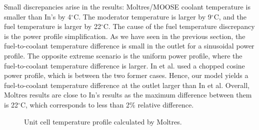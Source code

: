 Small discrepancies arise in the results: Moltres/MOOSE coolant temperature is smaller than In's by 4$^{\circ}$C.
The moderator temperature is larger by 9$^{\circ}$C, and the fuel temperature is larger by 22$^{\circ}$C.
The cause of the fuel temperature discrepancy is the power profile simplification.
As we have seen in the previous section, the fuel-to-coolant temperature difference is small in the outlet for a sinusoidal power profile. 
The opposite extreme scenario is the uniform power profile, where the fuel-to-coolant temperature difference is larger.
In et al. used a chopped cosine power profile, which is between the two former cases.
Hence, our model yields a fuel-to-coolant temperature difference at the outlet larger than In et al.
Overall, Moltres results are close to In's results as the maximum difference between them is 22$^{\circ}$C, which corresponds to less than 2\% relative difference.

\begin{figure}[htbp!]
  \centering
  \hfill
  \caption{Unit cell temperature profile calculated by Moltres.}
  \label{fig:th-val-unit-temps}
\end{figure}

